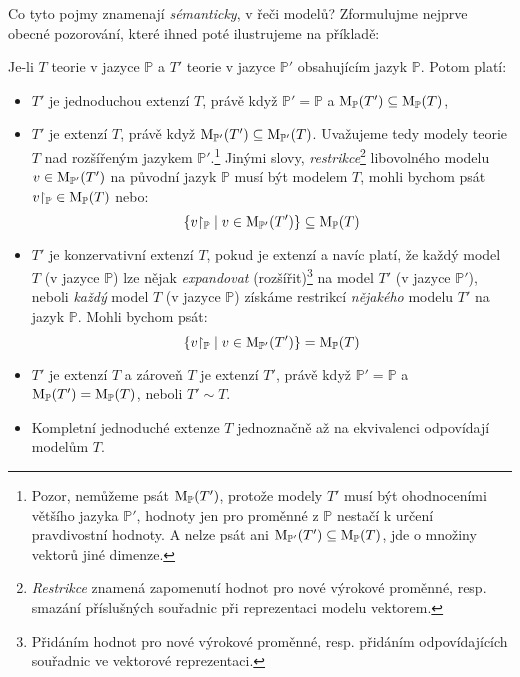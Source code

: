 Co tyto pojmy znamenají \emph{sémanticky}, v řeči modelů? Zformulujme nejprve obecné pozorování, které ihned poté ilustrujeme na příkladě:
\begin{observation}\label{observation:extensions-semantic-description-propositional}
    Je-li $T$ teorie v jazyce $\mathbb P$ a $T'$ teorie v jazyce $\mathbb P'$ obsahujícím jazyk $\mathbb P$. Potom platí:
    \begin{itemize}
        \item $T'$ je jednoduchou extenzí $T$, právě když $\mathbb P'=\mathbb P$ a $\operatorname{M}_\mathbb P(T')\subseteq\operatorname{M}_\mathbb P(T)$,
        \item $T'$ je extenzí $T$, právě když $\operatorname{M}_{\mathbb P'}(T')\subseteq\operatorname{M}_{\mathbb P'}(T)$. Uvažujeme tedy modely teorie $T$ nad rozšířeným jazykem $\mathbb P'$.\footnote{Pozor, nemůžeme psát $\operatorname{M}_\mathbb P(T')$, protože modely $T'$ musí být ohodnoceními většího jazyka $\mathbb P'$, hodnoty jen pro proměnné z $\mathbb P$ nestačí k určení pravdivostní hodnoty. A nelze psát ani $\operatorname{M}_{\mathbb P'}(T')\subseteq\operatorname{M}_{\mathbb P}(T)$, jde o množiny vektorů jiné dimenze.} Jinými slovy, \emph{restrikce}\footnote{\emph{Restrikce} znamená zapomenutí hodnot pro nové výrokové proměnné, resp. smazání příslušných souřadnic při reprezentaci modelu vektorem.} libovolného modelu $v\in\operatorname{M}_{\mathbb P'}(T')$ na původní jazyk $\mathbb P$ musí být modelem $T$, mohli bychom psát $v{\restriction_\mathbb P}\in\operatorname{M}_\mathbb P(T)$ nebo:
        $$
        \{v{\restriction_\mathbb P}\mid v\in\operatorname{M}_{\mathbb P'}(T')\}\subseteq\operatorname{M}_\mathbb P(T)
        $$
        \item $T'$ je konzervativní extenzí $T$, pokud je extenzí a navíc platí, že každý model $T$ (v jazyce $\mathbb P$) lze nějak \emph{expandovat} (rozšířit)\footnote{Přidáním hodnot pro nové výrokové proměnné, resp. přidáním odpovídajících souřadnic ve vektorové reprezentaci.} na model $T'$ (v jazyce $\mathbb P'$), neboli \emph{každý} model $T$ (v jazyce $\mathbb P$) získáme restrikcí \emph{nějakého} modelu $T'$ na jazyk $\mathbb P$. Mohli bychom psát:
        $$
        \{v{\restriction_\mathbb P}\mid v\in\operatorname{M}_      {\mathbb P'}(T')\}=\operatorname{M}_\mathbb P(T)
        $$
        \item $T'$ je extenzí $T$ a zároveň $T$ je extenzí $T'$, právě když $\mathbb P'=\mathbb P$ a $\operatorname{M}_\mathbb P(T')=\operatorname{M}_\mathbb P(T)$, neboli $T'\sim T$.
        \item Kompletní jednoduché extenze $T$ jednoznačně až na ekvivalenci odpovídají modelům $T$.
    \end{itemize}
\end{observation}

